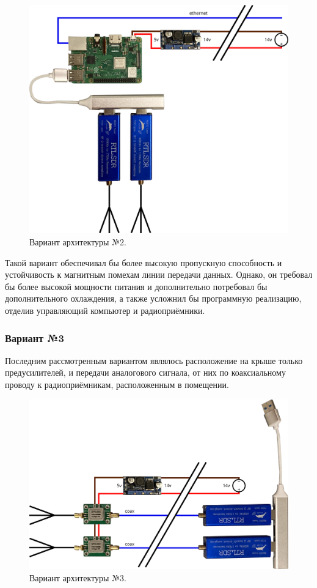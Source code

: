 \documentclass[a4paper, 14pt, titlepage, fleqn]{extarticle}
\begin{document}
	\begin{figure}[H]
		\centering
		\includegraphics[width=\textwidth]{planb.png}
		\caption{Вариант архитектуры №2.}
	\end{figure}
	
	Такой вариант обеспечивал бы более высокую пропускную способность и устойчивость к магнитным помехам линии передачи данных. Однако, он требовал бы более высокой мощности питания и дополнительно потребовал бы дополнительного охлаждения, а также усложнил бы программную реализацию, отделив управляющий компьютер и радиоприёмники.
	
	\pagebreak
	\subsubsection*{Вариант №3}
	
	Последним рассмотренным вариантом являлось расположение на крыше только предусилителей, и передачи аналогового сигнала, от них по коаксиальному проводу к радиоприёмникам, расположенным в помещении.
	
	\begin{figure}[H]
		\centering
		\includegraphics[width=\textwidth]{planc.png}
		\caption{Вариант архитектуры №3.}
	\end{figure}
	
\end{document}
